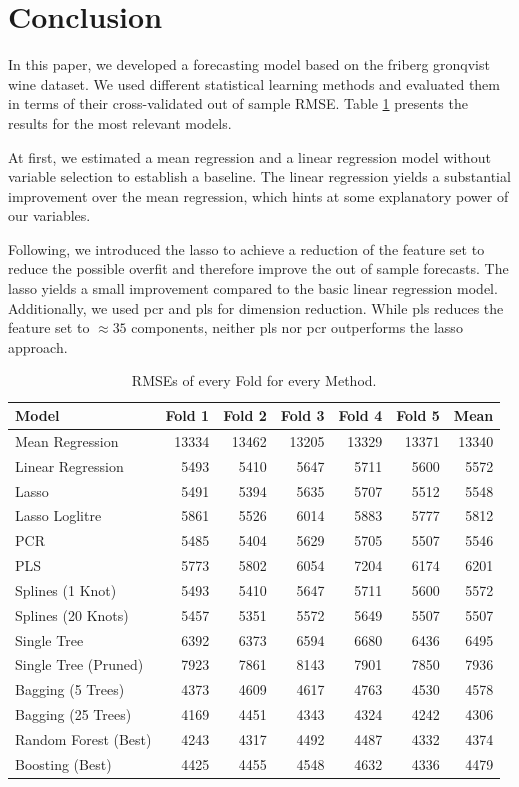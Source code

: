 \documentclass[11pt,]{article}
\begin{document}
\hypertarget{conclusion}{%
\section{\texorpdfstring{Conclusion
\label{chap:conc}}{Conclusion }}\label{conclusion}}

In this paper, we developed a forecasting model based on the friberg
gronqvist wine dataset. We used different statistical learning methods
and evaluated them in terms of their cross-validated out of sample
\ac{RMSE}. Table \ref{tab:RMSESum} presents the results for the most
relevant models.

At first, we estimated a mean regression and a linear regression model
without variable selection to establish a baseline. The linear
regression yields a substantial improvement over the mean regression,
which hints at some explanatory power of our variables.

Following, we introduced the \ac{lasso} to achieve a reduction of the
feature set to reduce the possible overfit and therefore improve the out
of sample forecasts. The lasso yields a small improvement compared to
the basic linear regression model. Additionally, we used \ac{pcr} and
\ac{pls} for dimension reduction. While \ac{pls} reduces the feature set
to \(\approx35\) components, neither \ac{pls} nor \ac{pcr} outperforms
the \ac{lasso} approach.

\begin{table}[t]

\caption{\label{tab:RMSE}\label{tab:RMSESum}RMSEs of every Fold for every Method.}
\centering
\begin{tabular}{lrrrrrr}
\toprule
Model & Fold 1 & Fold 2 & Fold 3 & Fold 4 & Fold 5 & Mean\\
\midrule
Mean Regression & 13334 & 13462 & 13205 & 13329 & 13371 & 13340\\
Linear Regression & 5493 & 5410 & 5647 & 5711 & 5600 & 5572\\
Lasso & 5491 & 5394 & 5635 & 5707 & 5512 & 5548\\
Lasso Loglitre & 5861 & 5526 & 6014 & 5883 & 5777 & 5812\\
PCR & 5485 & 5404 & 5629 & 5705 & 5507 & 5546\\
\addlinespace
PLS & 5773 & 5802 & 6054 & 7204 & 6174 & 6201\\
Splines (1 Knot) & 5493 & 5410 & 5647 & 5711 & 5600 & 5572\\
Splines (20 Knots) & 5457 & 5351 & 5572 & 5649 & 5507 & 5507\\
Single Tree & 6392 & 6373 & 6594 & 6680 & 6436 & 6495\\
Single Tree (Pruned) & 7923 & 7861 & 8143 & 7901 & 7850 & 7936\\
\addlinespace
Bagging (5 Trees) & 4373 & 4609 & 4617 & 4763 & 4530 & 4578\\
Bagging (25 Trees) & 4169 & 4451 & 4343 & 4324 & 4242 & 4306\\
Random Forest (Best) & 4243 & 4317 & 4492 & 4487 & 4332 & 4374\\
Boosting (Best) & 4425 & 4455 & 4548 & 4632 & 4336 & 4479\\
\bottomrule
\end{tabular}
\end{table}
\end{document}
